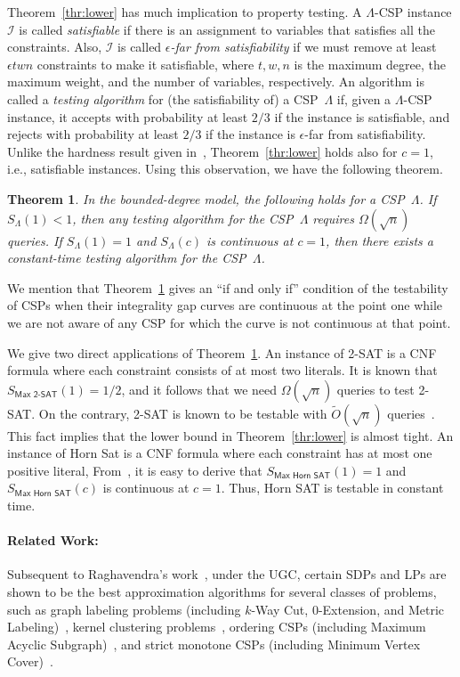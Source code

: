 \documentclass[letterpaper, 11pt]{article}
\newtheorem{theorem}{Theorem}[section]
\newcommand{\calI}{\mathcal{I}}
\begin{document}
Theorem~\ref{thr:lower} has much implication to property testing.
A $\Lambda$-CSP instance $\calI$ is called \textit{satisfiable} if there is an assignment to variables that satisfies all the constraints.
Also, $\calI$ is called \textit{$\epsilon$-far from satisfiability} if we must remove at least $\epsilon twn$ constraints to make it satisfiable,
where $t,w,n$ is the maximum degree, the maximum weight, and the number of variables, respectively.
An algorithm is called a \textit{testing algorithm} for (the satisfiability of) a CSP~$\Lambda$ if,
given a $\Lambda$-CSP instance,
it accepts with probability at least $2/3$ if the instance is satisfiable,
and rejects with probability at least $2/3$ if the instance is $\epsilon$-far from satisfiability.
Unlike the hardness result given in~\cite{Rag08}, 
Theorem~\ref{thr:lower} holds also for $c=1$,
i.e., satisfiable instances.
Using this observation, we have the following theorem.
\begin{theorem}\label{thr:prop}
  In the bounded-degree model, the following holds for a CSP~$\Lambda$.
  If $S_{\Lambda}(1) < 1$, then any testing algorithm for the CSP~$\Lambda$ requires $\Omega(\sqrt{n})$ queries.
  If $S_{\Lambda}(1) = 1$ and $S_{\Lambda}(c)$ is continuous at $c=1$,
  then there exists a constant-time testing algorithm for the CSP~$\Lambda$.
\end{theorem}
We mention that Theorem~\ref{thr:prop} gives an ``if and only if'' condition of the testability of CSPs when their integrality gap curves are continuous at the point one
while we are not aware of any CSP for which the curve is not continuous at that point.

We give two direct applications of Theorem~\ref{thr:prop}.
An instance of \textsf{2-SAT} is a CNF formula where each constraint consists of at most two literals.
It is known that $S_{\textsf{Max 2-SAT}}(1)=1/2$, and it follows that we need $\Omega(\sqrt{n})$ queries to test \textsf{2-SAT}.
On the contrary, \textsf{2-SAT} is known to be testable with $\tilde{O}(\sqrt{n})$ queries~\cite{GR99}.
This fact implies that the lower bound in Theorem~\ref{thr:lower} is almost tight.
An instance of \textsf{Horn Sat} is a CNF formula where each constraint has at most one positive literal,
From~\cite{Zwi98}, it is easy to derive that $S_{\textsf{Max Horn SAT}}(1)=1$ and $S_{\textsf{Max Horn SAT}}(c)$ is continuous at $c=1$.
Thus, \textsf{Horn SAT} is testable in constant time.

\vspace{-10pt}
\paragraph{Related Work:}
Subsequent to Raghavendra's work~\cite{Rag08},
under the UGC,
certain SDPs and LPs are shown to be the best approximation algorithms for several classes of problems,
such as 
graph labeling problems (including \textsf{$k$-Way Cut}, \textsf{$0$-Extension}, and \textsf{Metric Labeling})~\cite{MTRS08},
kernel clustering problems~\cite{KN09},
ordering CSPs (including \textsf{Maximum Acyclic Subgraph})~\cite{GMR08}, 
and strict monotone CSPs (including \textsf{Minimum Vertex Cover})~\cite{KMTV09}.
\end{document}
